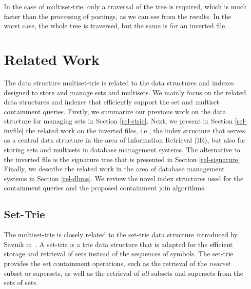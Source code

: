 \documentclass[algorithms,article,accept,pdftex,moreauthors]{Definitions/mdpi}
\begin{document}
In the case of multiset-trie, only a traversal of the tree is
required, which is much faster than the processing of postings, as we
can see from the results. In the worst case, the whole tree is
traversed, but the same is for an inverted file.

%
\section{Related Work} \label{c:relwork}

The data structure multiset-trie is related to the data structures and indexes designed to store and manage sets and multisets. We mainly focus on the related data structures and indexes that efficiently support the set and multiset containment queries. Firstly, we summarize our previous work on the data structure for managing sets in Section \ref{rel-strie}. Next, we present in Section \ref{rel-invfile} the related work on the inverted files, i.e., the index structure that serves as a central data structure in the area of Information Retrieval (IR), but also for storing sets and multisets in database management systems. The alternative to the inverted file is the signature tree that is presented in Section \ref{rel-signature}. Finally, we describe the related work in the area of database management systems in Section \ref{rel-dbms}. We review the novel index structures used for the containment queries and the proposed containment join algorithms. 


\subsection{Set-Trie\label{rel-strie}}

The multiset-trie is closely related to the set-trie data structure introduced by Savnik in~\cite{savnik2013index,savnik2021plos}. A set-trie is a trie data structure that is adapted for the efficient storage and retrieval of sets instead of the sequences of symbols. The set-trie provides the set containment operations, such as the retrieval of the \emph{nearest} subset or supersets, as well as the retrieval of \emph{all} subsets and supersets from the sets of sets.
\end{document}
